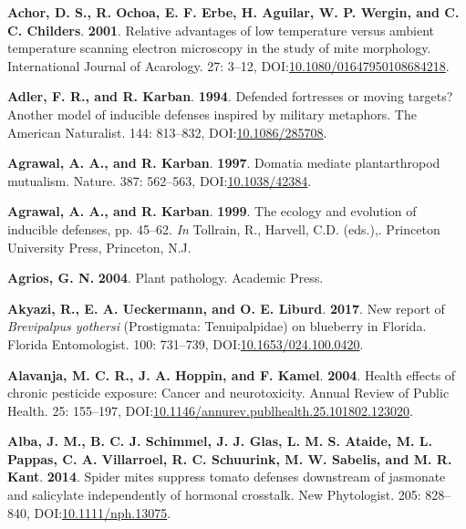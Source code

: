 \documentclass[12pt,final,CPage]{ufthesis}
\newlength{\cslhangindent}
\newenvironment{CSLReferences}[2] %
{%
	\setlength{\parindent}{0pt}
	\ifodd #1 \everypar{\setlength{\hangindent}{\cslhangindent}}\ignorespaces\fi
	\ifnum #2 > 0
	\setlength{\parskip}{#2\baselineskip}
	\fi
}%
{}
\begin{document}
{\begin{CSLReferences}{1}{0}
  \leavevmode{}%
  \textbf{Achor, D. S., R. Ochoa, E. F. Erbe, H. Aguilar, W. P. Wergin, and C. C. Childers}. \textbf{2001}. Relative advantages of low temperature versus ambient temperature scanning electron microscopy in the study of mite morphology. International Journal of Acarology. 27: 3--12, DOI:\href{https://doi.org/10.1080/01647950108684218}{10.1080/01647950108684218}.

  \leavevmode{}%
  \textbf{Adler, F. R., and R. Karban}. \textbf{1994}. Defended fortresses or moving targets? Another model of inducible defenses inspired by military metaphors. The American Naturalist. 144: 813--832, DOI:\href{https://doi.org/10.1086/285708}{10.1086/285708}.

  \leavevmode{}%
  \textbf{Agrawal, A. A., and R. Karban}. \textbf{1997}. Domatia mediate plantarthropod mutualism. Nature. 387: 562--563, DOI:\href{https://doi.org/10.1038/42384}{10.1038/42384}.

  \leavevmode{}%
  \textbf{Agrawal, A. A., and R. Karban}. \textbf{1999}. The ecology and evolution of inducible defenses, pp. 45--62. \emph{In} Tollrain, R., Harvell, C.D. (eds.),. Princeton University Press, Princeton, N.J.

  \leavevmode{}%
  \textbf{Agrios, G. N.} \textbf{2004}. Plant pathology. Academic Press.

  \leavevmode{}%
  \textbf{Akyazi, R., E. A. Ueckermann, and O. E. Liburd}. \textbf{2017}. New report of {\emph{Brevipalpus yothersi}} ({Prostigmata}: {Tenuipalpidae}) on blueberry in {Florida}. Florida Entomologist. 100: 731--739, DOI:\href{https://doi.org/10.1653/024.100.0420}{10.1653/024.100.0420}.

  \leavevmode{}%
  \textbf{Alavanja, M. C. R., J. A. Hoppin, and F. Kamel}. \textbf{2004}. Health effects of chronic pesticide exposure: Cancer and neurotoxicity. Annual Review of Public Health. 25: 155--197, DOI:\href{https://doi.org/10.1146/annurev.publhealth.25.101802.123020}{10.1146/annurev.publhealth.25.101802.123020}.

  \leavevmode{}%
  \textbf{Alba, J. M., B. C. J. Schimmel, J. J. Glas, L. M. S. Ataide, M. L. Pappas, C. A. Villarroel, R. C. Schuurink, M. W. Sabelis, and M. R. Kant}. \textbf{2014}. Spider mites suppress tomato defenses downstream of jasmonate and salicylate independently of hormonal crosstalk. New Phytologist. 205: 828--840, DOI:\href{https://doi.org/10.1111/nph.13075}{10.1111/nph.13075}.


\end{CSLReferences}}
\end{document}
